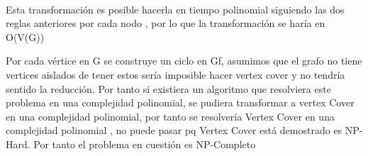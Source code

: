 \documentclass{article}
\begin{document}
\begin{minipage}{0.45\textwidth}
    \centering
\end{minipage}
\hfill
\begin{minipage}{0.45\textwidth}
    \centering
\end{minipage}
\\
Esta transformación es posible hacerla en tiempo polinomial siguiendo las dos reglas anteriores por cada nodo , por lo que la transformación se haría en O(V(G))

Por cada vértice en G se construye un ciclo en Gf, asumimos que el grafo no tiene vertices aislados de tener estos sería imposible hacer vertex cover y no tendría sentido la reducción. Por tanto si existiera un algoritmo que resolviera este problema en una complejidad polinomial, se pudiera transformar a vertex Cover en una complejidad polinomial, por tanto se resolvería Vertex Cover en una complejidad polinomial , no puede pasar pq Vertex Cover está demostrado es NP-Hard. Por tanto el problema en cuestión es NP-Completo
\end{document}

